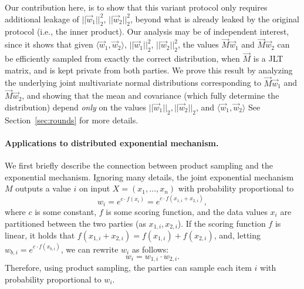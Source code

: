 Our contribution here, is to show that this variant protocol
only requires additional leakage of $||\vec{w}_1||_2^2$, $||\vec{w}_2||_2^2$, beyond what is already leaked 
by the original protocol (i.e., the inner product).
Our analysis may be of independent interest, since it shows that given $\langle \vec{w}_1, \vec{w}_2 \rangle$, $||\vec{w}_1||_2^2$, $||\vec{w}_2||_2^2$,
the values $\vec{M} \vec{w}_1$ and $\vec{M}\vec{w}_2$
can be efficiently sampled from exactly the correct distribution, when $\vec{M}$ is a JLT matrix, and is kept private from both parties.
We prove this result by analyzing the underlying
joint multivariate normal distributions corresponding to $\vec{M} \vec{w}_1$ and $\vec{M} \vec{w}_2$, and showing that the mean
and covariance 
(which fully determine the distribution)
depend \emph{only} on 
the values $||\vec{w}_1||_2, ||\vec{w}_2||_2$, and $\langle \vec{w}_1, \vec{w}_2 \rangle$
See Section~\ref{sec:rounds} for more details.

\paragraph{Applications to distributed exponential mechanism.}
We first briefly describe the connection between product sampling and
the exponential mechanism. Ignoring many details, the joint exponential
mechanism $M$ outputs a value $i$ on input $X=(x_1,\ldots,x_n)$ with
probability proportional to 
%
$$w_i = e^{c \cdot f(x_i)} = e^{c \cdot f(x_{1,i} + x_{2,i})},$$ 
%
where $c$ is some constant, $f$ is some scoring function, and the data values $x_i$ are partitioned between the two parties (as $x_{1,i}, x_{2,i}$). If the scoring
function $f$ is linear, it holds that $f(x_{1,i} + x_{2,i}) = f(x_{1,i}) +
f(x_{2,i})$, and, letting $w_{b,i} =  e^{c \cdot f(x_{b,i})}$, we can rewrite
$w_i$ as follows:
%
$$w_i = w_{1,i} \cdot w_{2,i}.$$ 
%
Therefore, using product sampling, the parties can sample each item $i$
with probability proportional to $w_i$.  
%
%

